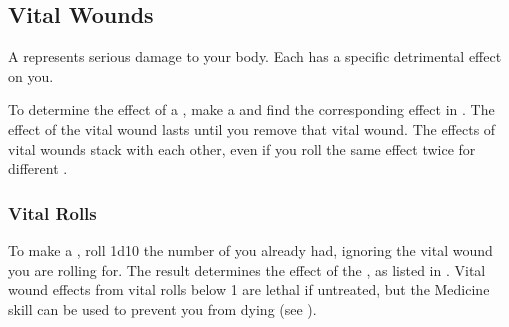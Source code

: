     \subsection{Vital Wounds}\label{Vital Wounds}
        A  represents serious damage to your body.
        Each  has a specific detrimental effect on you.

        To determine the effect of a , make a  and find the corresponding effect in .
        The effect of the vital wound lasts until you remove that vital wound.
        The effects of vital wounds stack with each other, even if you roll the same effect twice for different .

        \subsubsection{Vital Rolls}\label{Vital Rolls}
            To make a , roll 1d10 \sub the number of  you already had, ignoring the vital wound you are rolling for.
            The result determines the effect of the , as listed in .
            Vital wound effects from vital rolls below 1 are lethal if untreated, but the Medicine skill can be used to prevent you from dying (see ).

